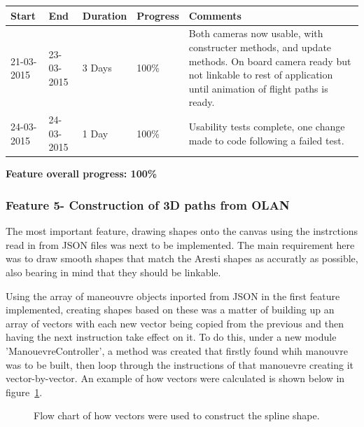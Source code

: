 \begin{table}[h]
\begin{tabular}{|l|l|l|l|p{7cm}|}
\hline
\textbf{Start} & \textbf{End} & \textbf{Duration} & \textbf{Progress} & \textbf{Comments}                                                                                                     \\ \hline
21-03-2015     & 23-03-2015   & 3 Days            & 100\%             &  Both cameras now usable, with constructer methods, and update methods. On board camera ready but not linkable to rest of application until animation of flight paths is ready.\\ \hline
24-03-2015     & 24-03-2015   & 1 Day            & 100\%             &  Usability tests complete, one change made to code following a failed test. \\ \hline
\end{tabular}
\end{table}

\textbf{Feature overall progress: 100\%}

\subsubsection{Feature 5- Construction of 3D paths from OLAN}
The most important feature, drawing shapes onto the canvas using the instrctions read in from JSON files was next to be implemented. The main requirement here was to draw smooth shapes that match the Aresti shapes as accuratly as possible, also bearing in mind that they should be linkable.

Using the array of maneouvre objects inported from JSON in the first feature implemented, creating shapes based on these was a matter of building up an array of vectors with each new vector being copied from the previous and then having the next instruction take effect on it. To do this, under a new module 'ManouevreController', a method was created that firstly found whih manouvre was to be built, then loop through the instructions of that manouevre creating it vector-by-vector. An example of how vectors were calculated is shown below in figure~\ref{fig:vectors}.

\begin{figure}[h]
  \centering
  \caption{Flow chart of how vectors were used to construct the spline shape.}
  \label{fig:vectors}
\end{figure}

